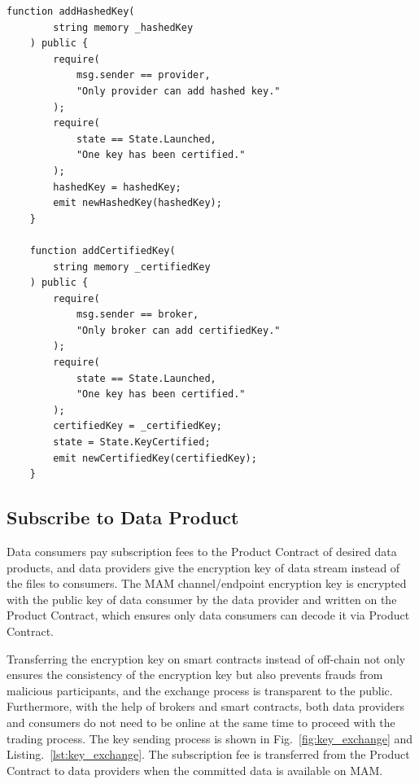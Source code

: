 \begin{spacing}{2.0}
\lstset{style=solidity}
\begin{lstlisting}[caption={Functions of hased key update and certified key update}, label={lst:key_certification}, frame=single]
    function addHashedKey(
        string memory _hashedKey
    ) public {
        require(
            msg.sender == provider,
            "Only provider can add hashed key."
        );
        require(
            state == State.Launched,
            "One key has been certified."
        );
        hashedKey = hashedKey;
        emit newHashedKey(hashedKey);
    }

    function addCertifiedKey(
        string memory _certifiedKey
    ) public {
        require(
            msg.sender == broker,
            "Only broker can add certifiedKey."
        );
        require(
            state == State.Launched,
            "One key has been certified."
        );
        certifiedKey = _certifiedKey;
        state = State.KeyCertified;
        emit newCertifiedKey(certifiedKey);
    }
\end{lstlisting}
\clearpage

\subsection{Subscribe to Data Product}
Data consumers pay subscription fees to the Product Contract of desired data products, and data providers give the encryption key of data stream instead of the files to consumers. The MAM channel/endpoint encryption key is encrypted with the public key of data consumer by the data provider and written on the Product Contract, which ensures only data consumers can decode it via Product Contract.

Transferring the encryption key on smart contracts instead of off-chain not only ensures the consistency of the encryption key but also prevents frauds from malicious participants, and the exchange process is transparent to the public. Furthermore, with the help of brokers and smart contracts, both data providers and consumers do not need to be online at the same time to proceed with the trading process. The key sending process is shown in Fig.~\ref{fig:key_exchange} and Listing.~\ref{lst:key_exchange}. The subscription fee is transferred from the Product Contract to data providers when the committed data is available on MAM.


\end{spacing}
